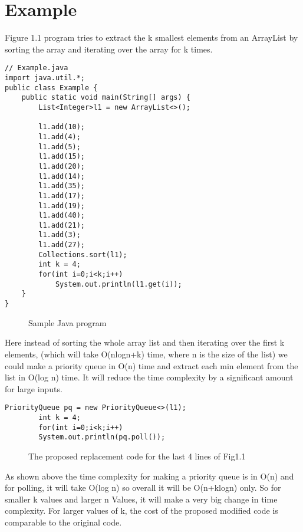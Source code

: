 \section{Example}
Figure 1.1 program tries to extract the k smallest elements from an ArrayList by sorting the array and iterating over the array for k times.
\begin{lstlisting}[style=java]
// Example.java
import java.util.*;
public class Example {
    public static void main(String[] args) {
        List<Integer>l1 = new ArrayList<>();

        l1.add(10);
        l1.add(4);
        l1.add(5);
        l1.add(15);
        l1.add(20);
        l1.add(14);
        l1.add(35);
        l1.add(17);
        l1.add(19);
        l1.add(40);
        l1.add(21);
        l1.add(3);
        l1.add(27);
        Collections.sort(l1);
        int k = 4;
        for(int i=0;i<k;i++)
            System.out.println(l1.get(i));
    }
}

\end{lstlisting}
\begin{figure} [h]
    \centering
    \caption{Sample Java program}
    \label{fig:my_label}
\end{figure}
Here instead of sorting the whole array list and then iterating over the first k elements, (which will take O(nlogn+k) time, where n is the size of the list) we could make a priority queue in O(n) time and extract each min element from the list in O(log n) time. It will reduce the time complexity by a significant amount for large inputs.
\begin{lstlisting}[style=java]
        PriorityQueue pq = new PriorityQueue<>(l1);
        int k = 4;
        for(int i=0;i<k;i++)
        System.out.println(pq.poll());

\end{lstlisting}
\begin{figure} [h]
    \centering
    \caption{The proposed replacement code for the last 4 lines of Fig1.1}
    \label{fig:my_label}
\end{figure}

As shown above the time complexity for making a priority queue is in O(n) and for polling, it will take O(log n) so overall it will be O(n+klogn) only. So for smaller k values and larger n Values, it will make a very big change in time complexity. For larger values of k, the cost of the proposed modified code is comparable to the original code.

